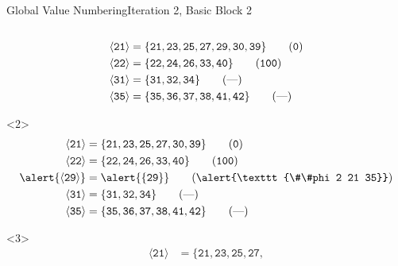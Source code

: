 \documentclass{beamer}
\newcommand{\vn}[1]{\ensuremath{\langle\texttt{#1}\rangle}}
\newcommand{\vreg}[1]{\texttt{#1}}
\begin{document}
\begin{frame}[fragile]{Global Value Numbering}{Iteration 2, Basic Block 2}
\begin{columns}[t,onlytextwidth]
\begin{column}{.5\textwidth}
\begin{onlyenv}
        \begin{align*}
          \vn{21} &= \{\vreg{21},
                       \vreg{23},
                       \vreg{25},
                       \vreg{27},
                       \vreg{29},
                       \vreg{30},
                       \vreg{39}\} \tag{\texttt{0}} \\
          \vn{22} &= \{\vreg{22},
                       \vreg{24},
                       \vreg{26},
                       \vreg{33},
                       \vreg{40}\} \tag{\texttt{100}} \\
          \vn{31} &= \{\vreg{31},
                       \vreg{32},
                       \vreg{34}\} \tag{---} \\
          \vn{35} &= \{\vreg{35},
                       \vreg{36},
                       \vreg{37},
                       \vreg{38},
                       \vreg{41},
                       \vreg{42}\} \tag{---}
        \end{align*}
      \end{onlyenv}
      \begin{onlyenv}<2>
        \begin{align*}
          \vn{21} &= \{\vreg{21},
                       \vreg{23},
                       \vreg{25},
                       \vreg{27},
                       \vreg{30},
                       \vreg{39}\} \tag{\texttt{0}} \\
          \vn{22} &= \{\vreg{22},
                       \vreg{24},
                       \vreg{26},
                       \vreg{33},
                       \vreg{40}\} \tag{\texttt{100}} \\
          \alert{\vn{29}} &= \alert{\{\vreg{29}\}} \tag{\alert{\texttt{\#\#phi 2 21 35}}} \\
          \vn{31} &= \{\vreg{31},
                       \vreg{32},
                       \vreg{34}\} \tag{---} \\
          \vn{35} &= \{\vreg{35},
                       \vreg{36},
                       \vreg{37},
                       \vreg{38},
                       \vreg{41},
                       \vreg{42}\} \tag{---}
        \end{align*}
      \end{onlyenv}
      \begin{onlyenv}<3>
        \begin{align*}
          \vn{21} &= \{\vreg{21},
                       \vreg{23},
                       \vreg{25},
                       \vreg{27},

\end{align*}
\end{onlyenv}
\end{column}
\end{columns}
\end{frame}
\end{document}
